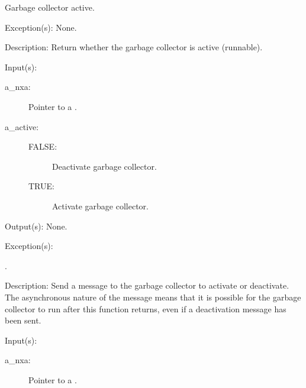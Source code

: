 \begin{capi}
\begin{capilist}
\begin{description}
\begin{description}
				Garbage collector active.
			\end{description}
		\end{description}
	\item[Exception(s): ] None.
	\item[Description: ]
		Return whether the garbage collector is active (runnable).
	\end{capilist}
\label{nxa_active_set}
	\begin{capilist}
	\item[Input(s): ]
		\begin{description}\item[]
		\item[a\_nxa: ]
			Pointer to a .
		\item[a\_active: ]
			\begin{description}\item[]
			\item[FALSE: ]
				Deactivate garbage collector.
			\item[TRUE: ]
				Activate garbage collector.
			\end{description}
		\end{description}
	\item[Output(s): ] None.
	\item[Exception(s): ]
		\begin{description}\item[]
		\item[.]
		\end{description}
	\item[Description: ]
		Send a message to the garbage collector to activate or
		deactivate.  The asynchronous nature of the message means that
		it is possible for the garbage collector to run after this
		function returns, even if a deactivation message has been sent.
	\end{capilist}
\label{nxa_period_get}
	\begin{capilist}
	\item[Input(s): ]
		\begin{description}\item[]
		\item[a\_nxa: ]
			Pointer to a \classname{nxa}.
		\end{description}

\end{capilist}
\end{capi}
